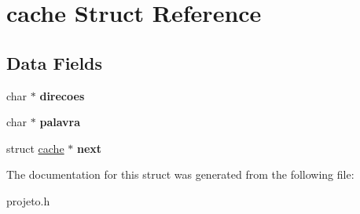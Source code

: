 \hypertarget{structcache}{}\section{cache Struct Reference}
\label{structcache}
\subsection*{Data Fields}
\begin{DoxyCompactItemize}
\item 
\mbox{\label{structcache_a52e03f2ee996fd6c923b9d027d819117}} 
char $\ast$ {\bfseries direcoes}
\item 
\mbox{\label{structcache_a649b161fdcdbc787b4cb3014fd06f3de}} 
char $\ast$ {\bfseries palavra}
\item 
\mbox{\label{structcache_afc4d94a39a30717bf64edd5eac601e66}} 
struct \mbox{\hyperlink{structcache}{cache}} $\ast$ {\bfseries next}
\end{DoxyCompactItemize}


The documentation for this struct was generated from the following file\+:\begin{DoxyCompactItemize}
\item 
projeto.\+h\end{DoxyCompactItemize}
